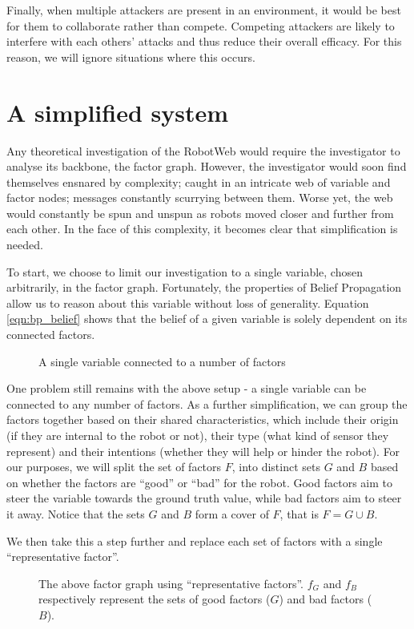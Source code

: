 Finally, when multiple attackers are present in an environment, it would be best for them to collaborate rather than compete. Competing attackers are likely to interfere with each others' attacks and thus reduce their overall efficacy. For this reason, we will ignore situations where this occurs.


\section{A simplified system}
Any theoretical investigation of the RobotWeb would require the investigator to analyse its backbone, the factor graph. However, the investigator would soon find themselves ensnared by complexity; caught in an intricate web of variable and factor nodes; messages constantly scurrying between them. Worse yet, the web would constantly be spun and unspun as robots moved closer and further from each other. In the face of this complexity, it becomes clear that simplification is needed.

To start, we choose to limit our investigation to a single variable, chosen arbitrarily, in the factor graph. Fortunately, the properties of Belief Propagation allow us to reason about this variable without loss of generality. Equation \ref{eqn:bp_belief} shows that the belief of a given variable is solely dependent on its connected factors. 

\begin{figure}[!h]
	\centering
	

	\caption[Single Variable in a Factor Graph]{A single variable connected to a number of factors}
\end{figure}

One problem still remains with the above setup - a single variable can be connected to any number of factors. As a further simplification, we can group the factors together based on their shared characteristics, which include their origin (if they are internal to the robot or not), their type (what kind of sensor they represent) and their intentions (whether they will help or hinder the robot). For our purposes, we will split the set of factors $F$, into distinct sets $G$ and $B$ based on whether the factors are ``good'' or ``bad'' for the robot. Good factors aim to steer the variable towards the ground truth value, while bad factors aim to steer it away. Notice that the sets $G$ and $B$ form a cover of $F$, that is $F = G \cup B$.

We then take this a step further and replace each set of factors with a single ``representative factor''.
\begin{figure}[!h]
	\centering
	

	\caption[Representative factor graph around a single variable]{The above factor graph using ``representative factors''. $f_G$ and $f_B$ respectively represent the sets of good factors ($G$) and bad factors ($B$).}
\end{figure}

